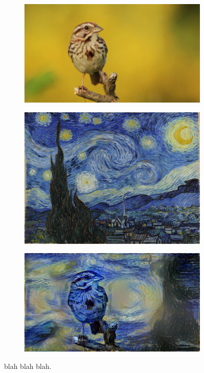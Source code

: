 \begin{figure}[!ht]
\centering
    \begin{subfigure}[b]{0.5\textwidth}
        \includegraphics[width=\textwidth]{images/content_img}
        \caption{}
        \label{i:content}
    \end{subfigure}
    \begin{subfigure}[b]{0.4\textwidth}
        \includegraphics[width=\textwidth]{images/starry-night}
        \caption{}
        \label{i:style}
    \end{subfigure}
    \newline
    \begin{subfigure}[b]{0.5\textwidth}
        \includegraphics[width=\textwidth]{images/stylized_img}
        \caption{}
        \label{i:stylized}
    \end{subfigure}
\caption{blah blah blah.}\label{i:style_set}
\end{figure}
